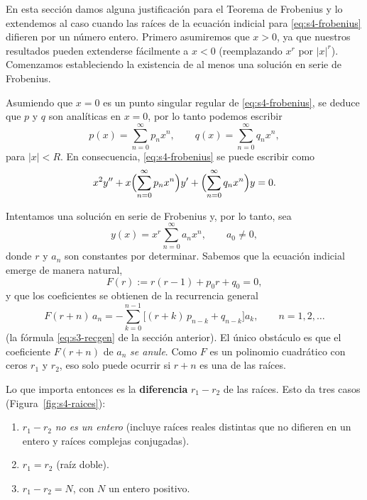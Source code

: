 En esta sección damos alguna justificación para el Teorema de Frobenius y lo extendemos al caso cuando las raíces de la ecuación indicial para \eqref{eq:s4-frobenius} difieren por un número entero. Primero asumiremos que $x > 0$, ya que nuestros resultados pueden extenderse fácilmente a $x < 0$ (reemplazando $x^r$ por $|x|^r$). Comenzamos estableciendo la existencia de al menos una solución en serie de Frobenius.
 
\begin{remark}
    Asumiendo que $x = 0$ es un punto singular regular de \eqref{eq:s4-frobenius}, se deduce que $p$ y $q$ son analíticas en $x = 0$, por lo tanto podemos escribir
\[ p(x) = \sum_{n=0}^{\infty} p_n x^n, \qquad q(x) = \sum_{n=0}^{\infty} q_n x^n, \]
para $|x| < R$. En consecuencia, \eqref{eq:s4-frobenius} se puede escribir como
\[ x^2 y'' + x \Bigl(\sum_{n=0}^{\infty} p_n x^n\Bigr) y' + \Bigl(\sum_{n=0}^{\infty} q_n x^n\Bigr) y = 0. \]
 
Intentamos una solución en serie de Frobenius y, por lo tanto, sea
\[ y(x) = x^r \sum_{n=0}^{\infty} a_n x^n, \qquad a_0 \neq 0, \]
donde $r$ y $a_n$ son constantes por determinar. Sabemos que la ecuación indicial emerge de manera natural,
\begin{equation}
F(r):=r(r - 1) + p_0 r + q_0 = 0,
\label{eq:s4-indicial}
\end{equation}
y que los coeficientes se obtienen de la recurrencia general
\begin{equation}
F(r+n)\,a_n=-\sum_{k=0}^{n-1}\bigl[(r+k)\,p_{n-k}+q_{n-k}\bigr]a_k,\qquad n=1,2,\dots
\label{eq:s4-recgen}
\end{equation}
(la fórmula \eqref{eq:s3-recgen} de la sección anterior). El único obstáculo es que el coeficiente $F(r+n)$ de $a_n$ \emph{se anule}. Como $F$ es un polinomio cuadrático con ceros $r_1$ y $r_2$, eso solo puede ocurrir si $r+n$ es una de las raíces.
\end{remark}
 
Lo que importa entonces es la \textbf{diferencia} $r_1-r_2$ de las raíces. Esto da tres casos (Figura~\ref{fig:s4-raices}):
 
\begin{enumerate}[label=\textbf{\Roman*.}, leftmargin=2.8em]
    \item $r_1-r_2$ \emph{no es un entero} (incluye raíces reales distintas que no difieren en un entero y raíces complejas conjugadas).
    \item $r_1=r_2$ (raíz doble).
    \item $r_1-r_2=N$, con $N$ un entero positivo.
\end{enumerate}
 
